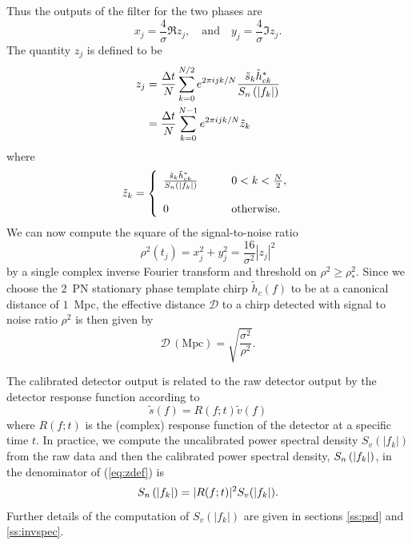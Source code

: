 Thus the outputs of the filter for the two phases are
\begin{equation}
x_j = \frac{4}{\sigma} \Re z_j,
\quad\mathrm{and}\quad
y_j = \frac{4}{\sigma} \Im z_j.
\end{equation}
The quantity $z_j$ is defined to be
\begin{equation}
\begin{split}
\label{eq:zdef}
z_j &= \frac{\Delta t}{N}\sum_{k=0}^{N/2} e^{2\pi ijk/N} 
\frac{\tilde{s}_k \tilde{h}_{ck}^\ast}{S_n\left(\left|f_{k}\right|\right)}  \\
&= \frac{\Delta t}{N}\sum_{k=0}^{N-1} e^{2\pi ijk/N} \tilde{z}_k
\end{split}
\end{equation}
where
\begin{equation}
\label{eq:ztildedef}
\tilde{z}_k = \left\{
\begin{array}{ll}
\frac{\tilde{s}_k \tilde{h}_{ck}^\ast}{S_n\left(\left|f_{k}\right|\right)} 
  \quad\quad & 0 < k < \frac{N}{2},\\
\\
0 & \mathrm{otherwise}.
\end{array}
\right.
\end{equation}
We can now compute the square of the signal-to-noise ratio
\begin{equation}
\rho^2(t_j) = x_j^2 + y_j^2 = \frac{16}{\sigma^2}|z_j|^2
\end{equation}
by a single complex inverse Fourier transform and threshold on 
$\rho^2 \ge \rho^2_\ast$.  Since we choose the 2~PN stationary phase template
chirp $\tilde{h}_c(f)$ to be at a canonical distance of $1$~Mpc, the effective
distance $\mathcal{D}$ to a chirp detected with signal to noise ratio $\rho^2$
is then given by
\begin{equation}
\mathcal{D}\,(\mathrm{Mpc})= \sqrt{\frac{\sigma^2}{\rho^2}}.
\end{equation}

The calibrated detector output is related to the raw detector output by the
detector response function according to
\begin{equation}
\tilde{s}(f) = R(f;t) \tilde{v}(f)
\end{equation}
where $R(f;t)$ is the (complex) response function of the detector at a
specific time $t$\cite{calpaper}. In practice, we compute the uncalibrated
power spectral density $S_v(|f_k|)$ from the raw data and then the calibrated
power spectral density, $S_n\left(\left|f_{k}\right|\right)$, in the denominator of (\ref{eq:zdef}) is
\begin{equation}
S_n\left(\left|f_{k}\right|\right) = |R(f;t)|^2 S_v(|f_k|).
\end{equation}
Further details of the computation of $S_v(|f_k|)$ are given in sections
\ref{ss:psd} and \ref{ss:invspec}.

